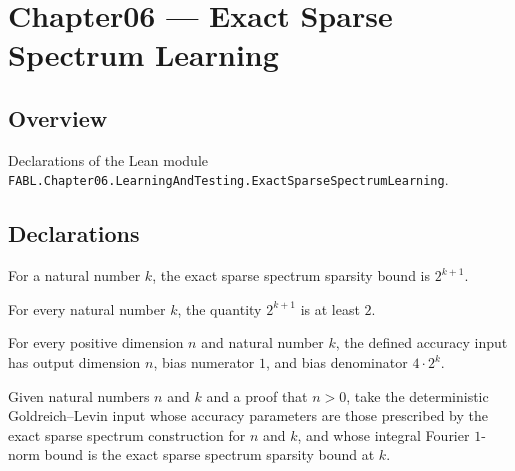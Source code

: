 \chapter{Chapter06 — Exact Sparse Spectrum Learning}
\section{Overview}

Declarations of the Lean module \texttt{FABL.Chapter06.LearningAndTesting.ExactSparseSpectrumLearning}.

\section{Declarations}

\begin{definition}
\label{FABL.exactSparseSpectrumSparsityBound}
\leanok
For a natural number $k$, the exact sparse spectrum sparsity bound is $2^{k+1}$.
\end{definition}

\begin{theorem}
\label{FABL.exactSparseSpectrumSparsityBound_two_le}
\leanok
{}
For every natural number $k$, the quantity $2^{k+1}$ is at least $2$.
\end{theorem}

\begin{definition}
\label{FABL.exactSparseSpectrumAccuracyInput}
\leanok
{}
For every positive dimension $n$ and natural number $k$, the defined accuracy input has
output dimension $n$, bias numerator $1$, and bias denominator $4\cdot 2^k$.
\end{definition}

\begin{definition}
\label{FABL.exactSparseSpectrumGoldreichLevinInput}
\leanok
{}
Given natural numbers $n$ and $k$ and a proof that $n>0$, take the deterministic
Goldreich–Levin input whose accuracy parameters are those prescribed by the exact sparse
spectrum construction for $n$ and $k$, and whose integral Fourier $1$-norm bound is the
exact sparse spectrum sparsity bound at $k$.
\end{definition}

